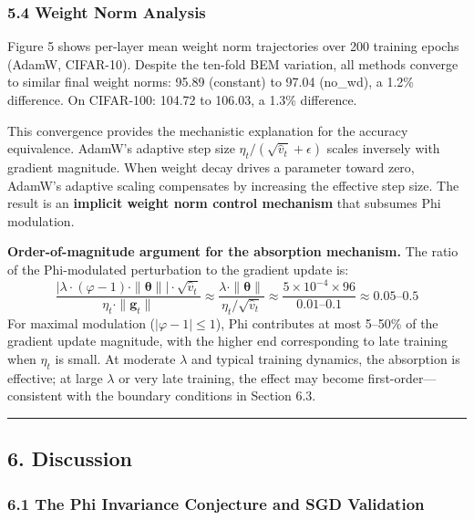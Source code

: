 \documentclass[
]{article}
\begin{document}
\hypertarget{weight-norm-analysis}{%
\subsubsection{5.4 Weight Norm Analysis}\label{weight-norm-analysis}}

Figure 5 shows per-layer mean weight norm trajectories over 200 training
epochs (AdamW, CIFAR-10). Despite the ten-fold BEM variation, all
methods converge to similar final weight norms: 95.89 (constant) to
97.04 (no\_wd), a 1.2\% difference. On CIFAR-100: 104.72 to 106.03, a
1.3\% difference.

This convergence provides the mechanistic explanation for the accuracy
equivalence. AdamW's adaptive step size
\(\eta_t / (\sqrt{\hat{v}_t} + \epsilon)\) scales inversely with
gradient magnitude. When weight decay drives a parameter toward zero,
AdamW's adaptive scaling compensates by increasing the effective step
size. The result is an \textbf{implicit weight norm control mechanism}
that subsumes Phi modulation.

\textbf{Order-of-magnitude argument for the absorption mechanism.} The
ratio of the Phi-modulated perturbation to the gradient update is: \[
\frac{|\lambda \cdot (\varphi - 1) \cdot \|\boldsymbol{\theta}\|| \cdot \sqrt{\hat{v}_t}}{\eta_t \cdot \|\mathbf{g}_t\|} \approx \frac{\lambda \cdot \|\boldsymbol{\theta}\|}{\eta_t / \sqrt{\hat{v}_t}} \approx \frac{5 \times 10^{-4} \times 96}{0.01\text{--}0.1} \approx 0.05\text{--}0.5
\] For maximal modulation (\(|\varphi - 1| \leq 1\)), Phi contributes at
most 5--50\% of the gradient update magnitude, with the higher end
corresponding to late training when \(\eta_t\) is small. At moderate
\(\lambda\) and typical training dynamics, the absorption is effective;
at large \(\lambda\) or very late training, the effect may become
first-order---consistent with the boundary conditions in Section 6.3.

\begin{center}\rule{0.5\linewidth}{0.5pt}\end{center}

\hypertarget{discussion}{%
\subsection{6. Discussion}\label{discussion}}

\hypertarget{the-phi-invariance-conjecture-and-sgd-validation}{%
\subsubsection{6.1 The Phi Invariance Conjecture and SGD
Validation}\label{the-phi-invariance-conjecture-and-sgd-validation}}
\end{document}
